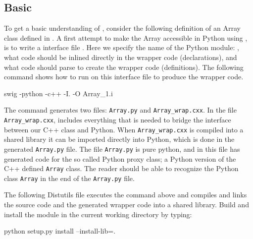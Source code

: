 \subsection{Basic \swig}
To get a basic understanding of \swig, consider the following definition of an Array class defined in . 
A first attempt to make the Array accessible in Python using \swig, is to write a \swig interface file .
Here we specify the name of the Python module: , what code should be inlined directly in the wrapper code (declarations),  and what code \swig should parse to create the wrapper code  (definitions). The following command shows how to run \swig on this interface file to produce the wrapper code.
\begin{code}
swig -python -c++ -I. -O Array_1.i
\end{code}
The command generates two files: \texttt{Array.py} and \texttt{Array\_}\texttt{wrap.cxx}. In the file \texttt{Array\_}\texttt{wrap.cxx}, \swig includes everything that is needed to bridge the interface between our C++ class and Python. When \texttt{Array\_wrap.cxx} is compiled into a shared library it can be imported directly into Python, which is done in the generated \texttt{Array.py} file. The file \texttt{Array.py} is  pure python, and in this file \swig has generated code for the so called Python proxy class; a Python version of the C++ defined \texttt{Array} class. The reader should be able to recognize the Python class \texttt{Array} in the end of the \texttt{Array.py} file. \par

The following Distutils file executes the \swig command above and compiles and links the source code and the generated wrapper code into a shared library.
Build and install the module in the current working directory by typing:
\begin{code}
python setup.py install --install-lib=.
\end{code}

